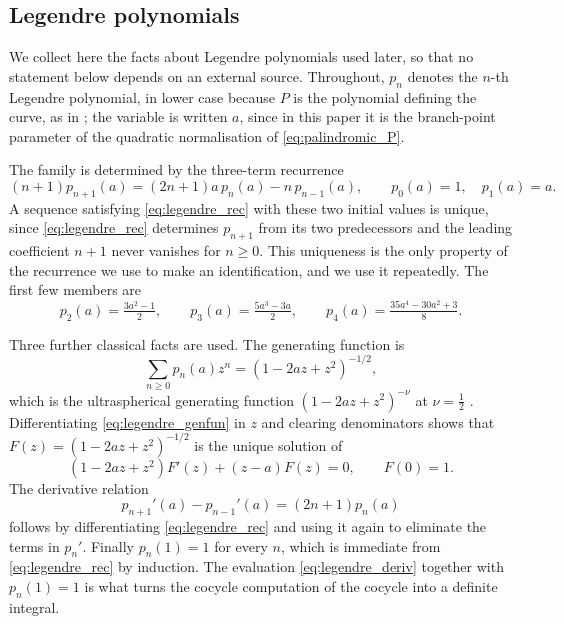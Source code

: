 \documentclass[11pt]{amsart}
\theoremstyle{definition}
\theoremstyle{remark}
\begin{document}
\subsection{Legendre polynomials}
\label{subsec:legendre}

We collect here the facts about Legendre polynomials used later, so that no
statement below depends on an external source. Throughout, $p_n$ denotes the
$n$-th Legendre polynomial, in lower case because $P$ is the polynomial defining
the curve, as in \cite{CoxZhao2018}; the variable is written $a$, since in this
paper it is the branch-point parameter of the quadratic normalisation of
\eqref{eq:palindromic_P}.

The family is determined by the three-term recurrence
\begin{equation}\label{eq:legendre_rec}
  (n+1)p_{n+1}(a) = (2n+1)a\,p_n(a) - n\,p_{n-1}(a),
  \qquad p_0(a)=1,\quad p_1(a)=a .
\end{equation}
A sequence satisfying \eqref{eq:legendre_rec} with these two initial values is
unique, since \eqref{eq:legendre_rec} determines $p_{n+1}$ from its two
predecessors and the leading coefficient $n+1$ never vanishes for $n\geq0$.
This uniqueness is the only property of the recurrence we use to make an
identification, and we use it repeatedly. The first few members are
\[
  p_2(a)=\tfrac{3a^2-1}{2},\qquad
  p_3(a)=\tfrac{5a^3-3a}{2},\qquad
  p_4(a)=\tfrac{35a^4-30a^2+3}{8}.
\]

Three further classical facts are used. The generating function is
\begin{equation}\label{eq:legendre_genfun}
  \sum_{n\geq0}p_n(a)z^n = (1-2az+z^2)^{-1/2},
\end{equation}
which is the ultraspherical generating function $(1-2az+z^2)^{-\nu}$ at
$\nu=\tfrac12$ \cite[(4.7.23)]{Szego1939}. Differentiating
\eqref{eq:legendre_genfun} in $z$ and clearing denominators shows that
$F(z)=(1-2az+z^2)^{-1/2}$ is the unique solution of
\begin{equation}\label{eq:legendre_ode}
  (1-2az+z^2)F'(z) + (z-a)F(z) = 0, \qquad F(0)=1 .
\end{equation}
The derivative relation
\begin{equation}\label{eq:legendre_deriv}
  p_{n+1}'(a) - p_{n-1}'(a) = (2n+1)p_n(a)
\end{equation}
follows by differentiating \eqref{eq:legendre_rec} and using it again to
eliminate the terms in $p_n'$. Finally $p_n(1)=1$ for every $n$, which is
immediate from \eqref{eq:legendre_rec} by induction. The evaluation
\eqref{eq:legendre_deriv} together with $p_n(1)=1$ is what turns the cocycle
computation of the cocycle into a definite integral.
\end{document}
